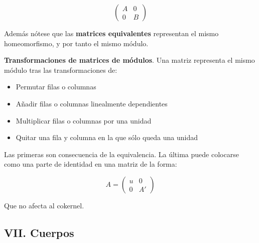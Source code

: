 \documentclass[11pt]{article}
\begin{document}
\begin{itemize}
\begin{theorem}
\[\left(\begin{array}{c|c}
 A & 0 \\ \hline 0 & B 
 \end{array}\right)\]
\end{theorem}

Además nótese que las \textbf{matrices equivalentes} representan el mismo 
homeomorfismo, y por tanto el mismo módulo.

\begin{theorem}
\textbf{Transformaciones de matrices de módulos}. Una matriz representa el mismo módulo
tras las transformaciones de:
\begin{itemize}
\item Permutar filas o columnas
\item Añadir filas o columnas linealmente dependientes
\item Multiplicar filas o columnas por una unidad
\item Quitar una fila y columna en la que sólo queda una unidad
\end{itemize}
\end{theorem}

Las primeras son consecuencia de la equivalencia. La última puede colocarse como
una parte de identidad en una matriz de la forma:

\[A = \left(\begin{array}{c|c}
 u & 0 \\ \hline 0 & A' 
 \end{array}\right)\]

Que no afecta al cokernel.
\end{itemize}

\subsection*{VII. Cuerpos}
\label{sec-4-3}
\end{document}
